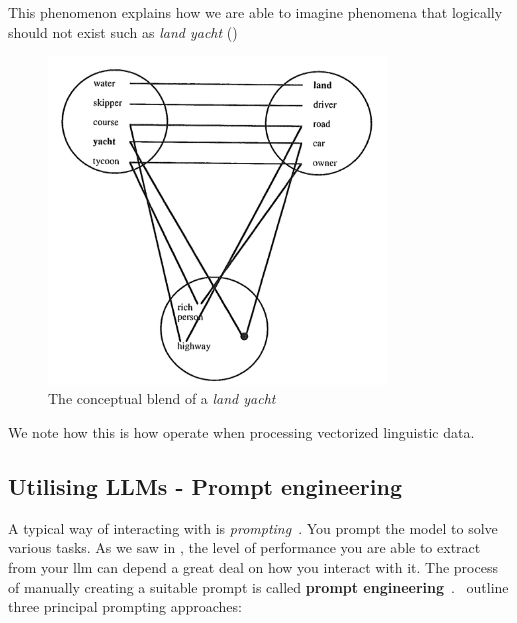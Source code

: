 This phenomenon explains how we are able to imagine phenomena that logically
should not exist such as \textit{land yacht} ()

\begin{figure}[h]
    \centering
    \includegraphics[width=0.8\textwidth]{figures/landYacht.png}
    \caption[Land yacht conceptual blend]{The conceptual blend of a \textit{land
            yacht}\footnotemark}\label{fig:landYacht}
\end{figure}


We note how this is how  operate when processing vectorized
linguistic data.


\subsection{Utilising LLMs - Prompt engineering}\label{sec:llmUtilization}


A typical way of interacting with  is \textit{prompting}~\cite[44]{llmSurvey}. You
prompt the model to solve various tasks. As we saw in , the level of
performance you are able to extract from your \acrlong{llm} can depend a great deal on how you
interact with it. The process of manually creating a suitable prompt is called \textbf{prompt
    engineering}~\cite[44]{llmSurvey}.~\citeauthor{llmSurvey} outline three principal prompting
approaches:

